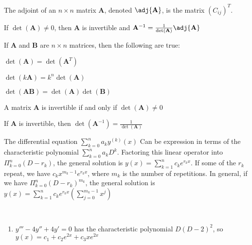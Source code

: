     \begin{definition}
        The adjoint of an ${n}\times{n}$ matrix
        $\mathbf{A}$, denoted $\adj{\mathbf{A}}$,
        is the matrix $(C_{ij})^{T}$.
    \end{definition}
    \begin{theorem}
        If ${\det(\mathbf{A})}\ne{0}$, then $\mathbf{A}$
        is invertible and
        $\mathbf{A}^{-1}=%
         \frac{1}{\det(\mathbf{A})}\adj{\mathbf{A}}$
    \end{theorem}
    \begin{theorem}
        If $\mathbf{A}$ and $\mathbf{B}$ are
        ${n}\times{n}$ matrices, then the following
        are true:
        \begin{enumerate}
            \begin{multicols}{3}
                \item $\det(\mathbf{A})%
                       =\det(\mathbf{A}^{T})$
                \item $\det(k\mathbf{A})%
                       =k^{n}\det(\mathbf{A})$
                \item $\det(\mathbf{A}\mathbf{B})%
                       =\det(\mathbf{A})\det(\mathbf{B})$
            \end{multicols}
        \end{enumerate}
    \end{theorem}
    \begin{theorem}
        A matrix $\mathbf{A}$ is invertible if and only
        if ${\det(\mathbf{A})}\ne{0}$
    \end{theorem}
    \begin{theorem}
        If $\mathbf{A}$ is invertible, then
        $\det(\mathbf{A}^{-1})=\frac{1}{\det(\mathbf{A})}$
    \end{theorem}
    The differential equation
    $\sum_{k=0}^{n}a_{k}y^{(k)}(x)$ Can be expression
    in terms of the characteristic polynomial
    $\sum_{k=0}^{n}a_{k}D^{k}$. Factoring this linear
    operator into $\Pi_{k=0}^{n}(D-r_{k})$,
    the general solution is
    $y(x)=\sum_{k=1}^{n}c_{k}e^{r_{k}x}$. If some of the
    $r_{k}$ repeat, we have $c_{k}x^{m_{k}-1}e^{r_{k}x}$,
    where $m_{k}$ is the number of repetitions.
    In general, if we have
    $\Pi_{k=0}^{n}(D-r_{k})^{m_{k}}$, the general
    solution is
    $y(x)=%
     \sum_{k=1}^{n}c_{k}e^{r_{k}x}%
     (\sum_{j=0}^{m_{k}-1}x^{j})$
    \begin{example}
        \
        \begin{enumerate}
            \item $y'''-4y''+4y'=0$ has the characteristic
                polynomial $D(D-2)^{2}$, so
                $y(x)=c_{1}+c_{2}e^{2x}+c_{3}xe^{2x}$
        \end{enumerate}
    \end{example}
